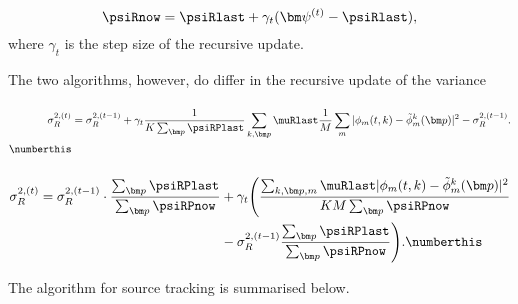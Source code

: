 \begin{equation}
\label{eq:crem-psi}
    \psiRnow = \psiRlast +\gamma_t(\bm\psi^{(t)} -\psiRlast ),
\end{equation}
where $\gamma_t$ is the step size of the recursive update.

The two algorithms, however, do differ in the recursive update of the variance

\paragraph{}
\begin{align*}
    \sigma_R^{2,(t)} &= \sigma_R^{2,(t-1)}+\gamma_t\frac{1}{K\*\sum_{\bm p}\psiRPlast} \sum_{k,\bm p}\muRlast\*\frac{1}{M}\sum_{m}|\phi_m(t,k)-\tilde\phi_m^k(\bm p)|^2-\sigma_{R}^{2,(t-1)}.\\
\numberthis\label{eq:trem-var}
\end{align*}

\paragraph{}
\begin{align*}
    \sigma_R^{2,(t)} = \sigma_R^{2,(t-1)}\cdot\frac{\sum_{\bm p}\psiRPlast}{\sum_{\bm p}\psiRPnow}&+\gamma_t\Bigg ( \frac{\sum_{k,\bm p,m}\muRlast|\phi_m(t,k)-\tilde\phi_m^k(\bm p)|^2}{K \* M \* \sum_{\bm p}\psiRPnow}\\
    &-\sigma_R^{2,(t-1)}\frac{\sum_{\bm p}\psiRPlast}{\sum_{\bm p}\psiRPnow} \Bigg ).
\numberthis\label{eq:crem-var}
\end{align*}

The algorithm for source tracking is summarised below.



